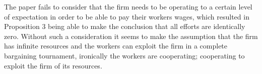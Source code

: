 \documentclass[a4paper,10pt]{article}
\theoremstyle{definition}
\begin{document}
The paper fails to consider that the firm needs to be operating to a certain level of expectation in order to be able to pay their workers wages, which resulted in Proposition 3 being able to make the conclusion that all efforts are identically zero. Without such a consideration it seems to make the assumption that the firm has infinite resources and the workers can exploit the firm in a complete bargaining tournament, ironically the workers are cooperating; cooperating to exploit the firm of its resources.

%
%
%
%
%
%
\end{document}
